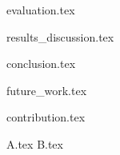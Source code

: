 \documentclass[11pt,a4paper]{report}
\numberwithin{figure}{section}
\numberwithin{table}{section}
\begin{document}
{evaluation.tex}
\clearpage

{results_discussion.tex}
\clearpage

{conclusion.tex}
\clearpage

{future_work.tex}
\clearpage

{contribution.tex}
\clearpage

\appendix
{A.tex}
{B.tex}
\clearpage



\thispagestyle{empty}
\clearpage
\end{document}
